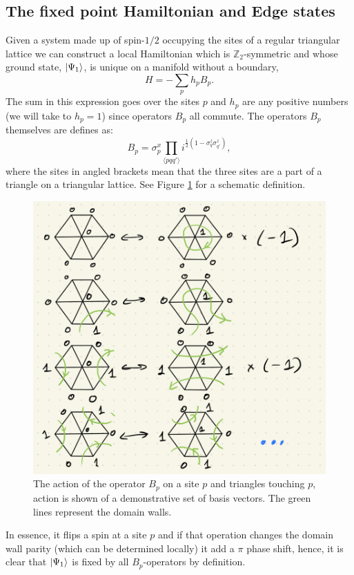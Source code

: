 \documentclass[a4paper,twocolumn,11pt]{quantumarticle}
\begin{document}
\subsection{The fixed point Hamiltonian and Edge states}

Given a system made up of spin-$1/2$ occupying the sites of a regular triangular lattice we can construct a local Hamiltonian which is $\mathbb{Z}_2$-symmetric and whose ground state, $\ket{\Psi_1}$, is unique on a manifold without a boundary, \begin{equation}
H = - \sum_p h_p B_p.\label{eqn:ham}
\end{equation}
The sum in this expression goes over the sites $p$ and $h_p$ are any positive numbers (we will take to $h_p = 1$) since operators $B_p$ all commute. 
The operators $B_p$ themselves are defines as:\begin{equation}
B_p = \sigma^x_p \prod_{\langle pqq' \rangle} i^{\frac{1}{2}(1-\sigma^z_q\sigma^z_{q'})},
\end{equation}
where the sites in angled brackets mean that the three sites are a part of a triangle on a triangular lattice. See Figure \ref{fig:bp} for a schematic definition.\begin{figure}
\centering
\includegraphics[width=\linewidth]{Figures/b_p.png}
\caption{The action of the operator $B_p$ on a site $p$ and triangles touching $p$, action is shown of a demonstrative set of basis vectors. The green lines represent the domain walls.}
\label{fig:bp}
\end{figure}
In essence, it flips a spin at a site $p$ and if that operation changes the domain wall parity (which can be determined locally) it add a $\pi$ phase shift, hence, it is clear that $\ket{\Psi_1}$ is fixed by all $B_p$-operators by definition.
\end{document}
